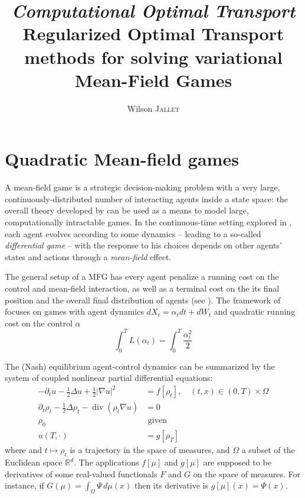 \documentclass[11pt]{article}
\author{Wilson \textsc{Jallet}}
\title{
	{\Large\itshape Computational Optimal Transport}\\
	{\Large Regularized Optimal Transport methods for solving variational Mean-Field Games}}
\newcommand{\RR}{\mathbb{R}}
\DeclareMathOperator{\divg}{div}
\numberwithin{equation}{section}
\theoremstyle{definition}
\begin{document}
\maketitle


\section{Quadratic Mean-field games}

A mean-field game \cite{LASRY2006619,LASRY2006679} is a strategic decision-making problem with a very large, continuously-distributed number of interacting agents inside a state space: the overall theory developed by \citeauthor{LASRY2006619} can be used as a means to model large, computationally intractable games. In the continuous-time setting explored in \cite{LASRY2006679}, each agent evolves according to some dynamics -- leading to a so-called \textit{differential game} -- with the response to his choices depends on other agents' states and actions through a \textit{mean-field} effect.


The general setup of a MFG has every agent penalize a running cost on the control and mean-field interaction, as well as a terminal cost on the its final position and the overall final distribution of agents (see \cite{LASRY2006679}). The framework of \cites{benamou:hal-01295299}{benamou2018entropy} focuses on games with agent dynamics $dX_t = \alpha_tdt + dW_t$ and quadratic running cost on the control $\alpha$
\[
	\int_0^T L(\alpha_t) = \int_0^T\frac{\alpha_t^2}{2}
\]



The (Nash) equilibrium agent-control dynamics can be summarized by the system of coupled nonlinear partial differential equations:
\begin{subequations}\label{eq:VariationalQuadraticMFG}
\begin{align}\label{eq:VarQuadMFGHJB}
	-\partial_t u - \frac{1}{2}\Delta u + \frac12|\nabla u|^2 &= f[\rho_t], \quad (t,x) \in  (0, T) \times \Omega \\\label{eq:VarQuadMFGKolmo}
	\partial_t \rho_t - \frac{1}{2}\Delta\rho_t - \divg(\rho_t \nabla u) &= 0 \\
	\rho_0 &\text{ given} \\
	u(T, \cdot) &= g[\rho_T]
\end{align}
\end{subequations}
where and $t\mapsto \rho_t$ is a trajectory in the space of measures, and $\Omega$ a subset of the Euclidean space $\RR^d$. The applications $f[\mu]$ and $g[\mu]$ are supposed to be derivatives of some real-valued functionals $F$ and $G$ on the space of measures. For instance, if $G(\mu) = \int_\Omega \Psi\,d\mu(x)$ then its derivative is $g[\mu](x) = \Psi(x)$.
\end{document}

